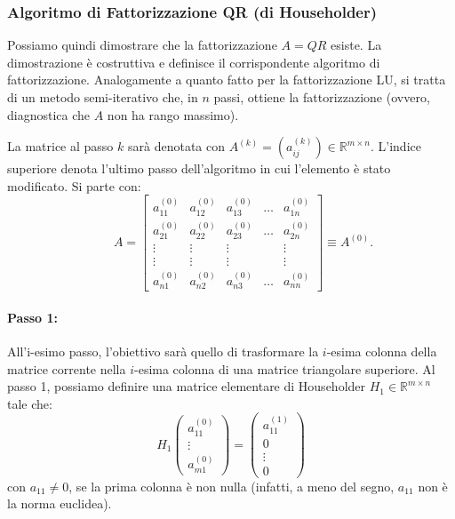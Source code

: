 \subsubsection{Algoritmo di Fattorizzazione QR (di Householder)}
Possiamo quindi dimostrare che la fattorizzazione $A=QR$ esiste. La dimostrazione è costruttiva e definisce il corrispondente algoritmo di fattorizzazione.
Analogamente a quanto fatto per la fattorizzazione LU, si tratta di un metodo semi-iterativo che, in $n$ passi, ottiene la fattorizzazione (ovvero, diagnostica che $A$ non ha rango massimo).

La matrice al passo $k$ sarà denotata con $A^{(k)} = (a_{ij}^{(k)}) \in \mathbb{R}^{m \times n}$. L'indice superiore denota l'ultimo passo dell'algoritmo in cui l'elemento è stato modificato.
Si parte con:
\begin{equation} \label{eq:matrice_A0}
     \qquad
    A = 
    \begin{bmatrix}
    a_{11}^{(0)} & a_{12}^{(0)} & a_{13}^{(0)} & \dots & a_{1n}^{(0)} \\
    a_{21}^{(0)} & a_{22}^{(0)} & a_{23}^{(0)} & \dots & a_{2n}^{(0)} \\
    \vdots & \vdots & \vdots & & \vdots \\
    \vdots & \vdots & \vdots & & \vdots \\
    a_{n1}^{(0)} & a_{n2}^{(0)} & a_{n3}^{(0)} & \dots & a_{nn}^{(0)}
    \end{bmatrix}
    \equiv A^{(0)}.
    \end{equation}

\paragraph{Passo 1:}
All'i-esimo passo, l'obiettivo sarà quello di trasformare la $i$-esima colonna della matrice corrente nella $i$-esima colonna di una matrice triangolare superiore.
Al passo 1, possiamo definire una matrice elementare di Householder $H_1 \in \mathbb{R}^{m \times n}$ tale che:
$$ H_1 \begin{pmatrix} a_{11}^{(0)} \\ \vdots \\ a_{m1}^{(0)} \end{pmatrix} = \begin{pmatrix} a_{11}^{(1)} \\ 0 \\ \vdots \\ 0 \end{pmatrix} $$
con $a_{11} \neq 0$, se la prima colonna è non nulla (infatti, a meno del segno, $a_{11}$ non è la norma euclidea).

